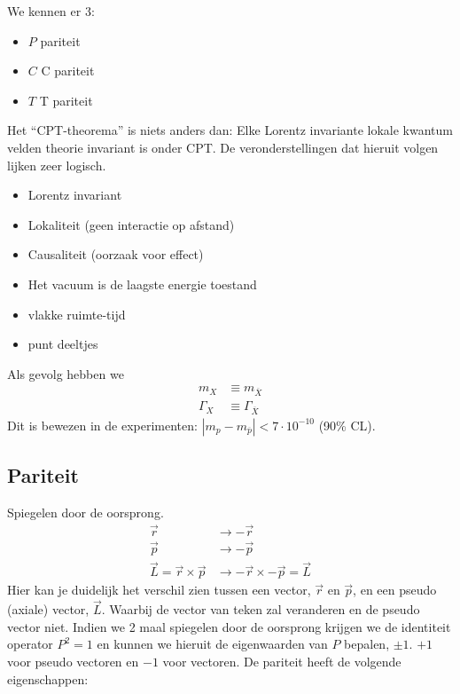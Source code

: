 \documentclass[../main.tex]{subfiles}
\begin{document}
We kennen er 3:
\begin{itemize}
    \item $P$ pariteit
    \item $C$ C pariteit
    \item $T$ T pariteit
\end{itemize}
Het ``CPT-theorema'' is niets anders dan: Elke Lorentz invariante lokale kwantum velden theorie invariant is onder CPT. De veronderstellingen dat hieruit volgen lijken zeer logisch.
\begin{itemize}
    \item Lorentz invariant
    \item Lokaliteit (geen interactie op afstand)
    \item Causaliteit (oorzaak voor effect)
    \item Het vacuum is de laagste energie toestand
    \item vlakke ruimte-tijd
    \item punt deeltjes
\end{itemize}
Als gevolg hebben we
\begin{equation}
    \begin{aligned}
        \label{eq:CPT_gevolgen}
        m_X&\equiv m_{\overline X}\\
        \Gamma_X&\equiv \Gamma_{\overline X}
    \end{aligned}
\end{equation}
Dit is bewezen in de experimenten: $|m_p-m_{\overline p}|<7\cdot10^{-10}$ (90\% CL).

\subsection{Pariteit}%
\label{sub:pariteit}

Spiegelen door de oorsprong.
\begin{equation}
    \begin{aligned}
        \label{eq:pariteit}
        \vec{r}&\rightarrow -\vec{r}\\
        \vec{p}&\rightarrow -\vec{p}\\
        \vec{L} = \vec{r}\times\vec{p}&\rightarrow -\vec{r} \times -\vec{p} = \vec{L}
    \end{aligned}
\end{equation}
Hier kan je duidelijk het verschil zien tussen een vector, $\vec{r}$ en $\vec{p}$, en een pseudo (axiale) vector, $\vec{L}$. Waarbij de vector van teken zal veranderen en de pseudo vector niet. Indien we 2 maal spiegelen door de oorsprong krijgen we de identiteit operator $P^2=1$ en kunnen we hieruit de eigenwaarden van $P$ bepalen, $\pm1$. $+1$ voor pseudo vectoren en $-1$ voor vectoren. De pariteit heeft de volgende eigenschappen:
\end{document}
